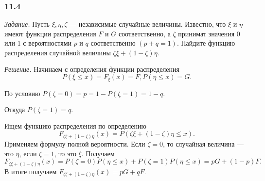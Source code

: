 \subsubsection*{11.4}

\textit{Задание.} Пусть $ \xi, \eta, \zeta $ --- независимые случайные величины.
Известно,
что $ \xi $ и $ \eta $ имеют функции распределения $F$ и $G$ соответственно,
а $ \zeta $ принимат значения 0 или 1 с вероятностями $p$ и $q$ соответственно $ \left( p + q = 1 \right) $.
Найдите функцию распределения случайной величины $ \zeta \xi + \left( 1 - \zeta \right) \eta $.

\textit{Решение.} Начинаем с определения функции распределения
$$P \left( \xi \leq x \right) = F_{ \xi } \left( x \right) = F,
P \left( \eta \leq x \right) = G.$$

По условию $P \left( \zeta = 0 \right) = p = 1 - P \left( \zeta = 1 \right) = 1 - q$.

Откуда $P \left( \zeta = 1 \right) = q$.

Ищем функцию распределения по определению
$$F_{ \zeta \xi + \left( 1 - \zeta \right) \eta } \left( x \right) =
P \left(  \zeta \xi + \left( 1 - \zeta \right) \eta \leq x \right).$$
Применяем формулу полной вероятности.
Если $ \zeta = 0$, то случайная величина --- это $ \eta $, если $ \zeta = 1$, то это $ \xi $.
Получаем
$$F_{ \zeta \xi + \left( 1 - \zeta \right) \eta } \left( x \right) =
P \left( \zeta = 0 \right) P \left( \eta \leq x \right) + P \left( \zeta = 1 \right) P \left( \eta \leq x \right) =
pG + \left( 1 - p \right) F.$$
В итоге получаем $F_{ \zeta \xi + \left( 1 - \zeta \right) \eta } \left( x \right) = pG + qF.$

